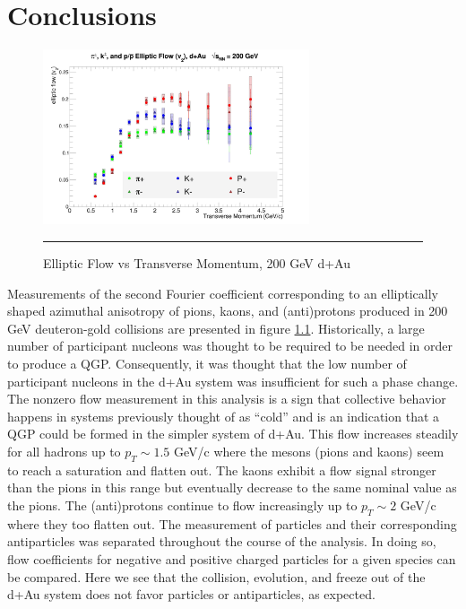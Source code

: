 
\chapter{Conclusions} %

\begin{figure}[hbtp]

\centering
    \includegraphics[width=0.7\textwidth]{results/v2all.jpg}
    \rule{35em}{0.5pt}
    \caption[Elliptic Flow vs Transverse Momentum, 200 GeV d+Au]{Elliptic Flow vs Transverse Momentum, 200 GeV d+Au}
    \label{fig:v2main}
\end{figure}

Measurements of the second Fourier coefficient corresponding to an elliptically shaped azimuthal anisotropy of pions, kaons, and (anti)protons produced in 200 GeV deuteron-gold collisions are presented in figure \ref{fig:v2main}. Historically, a large number of participant nucleons was thought to be required to be needed in order to produce a QGP. Consequently, it was thought that the low number of participant nucleons in the d+Au system was insufficient for such a phase change. The nonzero flow measurement in this analysis is a sign that collective behavior happens in systems previously thought of as ``cold'' and is an indication that a QGP could be formed in the simpler system of d+Au. This flow increases steadily for all hadrons up to $p_T \sim 1.5 $ GeV/c where the mesons (pions and kaons) seem to reach a saturation and flatten out. The kaons exhibit a flow signal stronger than the pions in this range but eventually decrease to the same nominal value as the pions. The (anti)protons continue to flow increasingly up to $p_T \sim 2$ GeV/c where they too flatten out. The measurement of particles and their corresponding antiparticles was separated throughout the course of the analysis. In doing so, flow coefficients for negative and positive charged particles for a given species can be compared. Here we see that the collision, evolution, and freeze out of the d+Au system does not favor particles or antiparticles, as expected.

